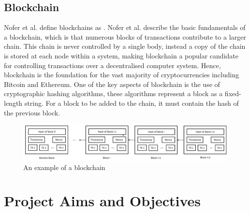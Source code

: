 \documentclass[a4paper, 11pt]{report}
\begin{document}
\section{Blockchain}
Nofer et al. define \gls{blockchain}s as  \cite{blockchain}. Nofer et al. describe the basic fundamentals of a \gls{blockchain}, which is that numerous blocks of transactions contribute to a larger chain. This chain is never controlled by a single body, instead a copy of the chain is stored at each node within a system, making \gls{blockchain} a popular candidate for controlling transactions over a decentralised computer system. Hence, \gls{blockchain} is the foundation for the vast majority of cryptocurrencies including Bitcoin\cite{bitcoin} and Ethereum\cite{ethereum}. One of the key aspects of \gls{blockchain} is the use of cryptographic \gls{hashing} algorithms, these algorithms represent a block as a fixed-length string. For a block to be added to the chain, it must contain the hash of the previous block.

\begin{center}
	\begin{figure}[H]
		\includegraphics[width=\textwidth,keepaspectratio]{NoferBlock}
		\caption{An example of a \gls{blockchain} \cite{blockchain}} 
		\label{fig:blockchain}
	\end{figure}
\end{center}

\chapter{Project Aims and Objectives}
\end{document}

